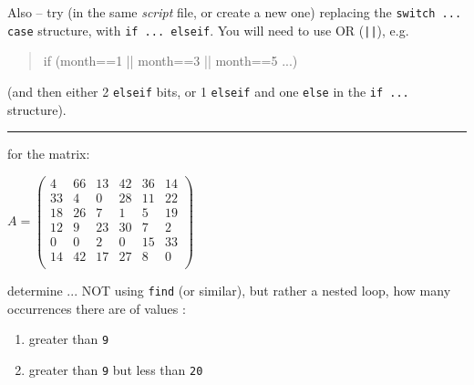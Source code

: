 \documentclass{tufte-book} %
\newenvironment{docspec}{\begin{quotation}\ttfamily\parskip0pt\parindent0pt\ignorespaces}{\end{quotation}}
\begin{document}
Also -- try (in the same \textit{script} file, or create a new one) replacing the \texttt{switch ... case} structure, with \texttt{if ... elseif}. You will need to use OR (\texttt{||}), e.g. 
\begin{docspec}
if (month==1 || month==3 || month==5 ...)
\end{docspec}
(and then either 2 \texttt{elseif} bits, or 1 \texttt{elseif} and one \texttt{else} in the \texttt{if ...} structure).

\vspace{1mm}
\noindent\rule{4cm}{0.5pt}
\vspace{-2mm}

\vspace{20mm}

\pagebreak

 for the matrix:

\vspace{4mm}
\(A=\begin{pmatrix}4 & 66 & 13 & 42 & 36 & 14 \\
33 & 4 & 0 & 28 & 11 & 22 \\
18 & 26 & 7 & 1 & 5 & 19 \\
12 & 9 & 23 & 30 & 7 & 2 \\
0 & 0 & 2 & 0 & 15 & 33 \\
14 & 42 & 17 & 27 & 8 & 0 \\
\end{pmatrix}\)
\vspace{4mm}

\noindent determine ... NOT using \texttt{find} (or similar), but rather a nested loop, how many occurrences there are of values
:

\vspace{-2mm}
\begin{enumerate}[noitemsep]
\item greater than \texttt{9}
\item greater than \texttt{9} but less than \texttt{20}
\end{enumerate}
\vspace{-2mm}
\end{document}

